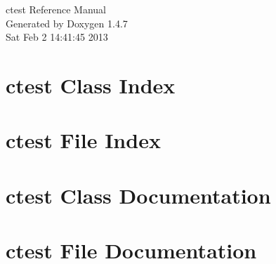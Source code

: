 \documentclass[a4paper]{book}
\begin{document}
\begin{titlepage}
\vspace*{7cm}
\begin{center}
{\Large ctest Reference Manual}\\
\vspace*{1cm}
{\large Generated by Doxygen 1.4.7}\\
\vspace*{0.5cm}
{\small Sat Feb 2 14:41:45 2013}\\
\end{center}
\end{titlepage}
\clearemptydoublepage
{}
\tableofcontents
\clearemptydoublepage
{}
\chapter{ctest Class Index}

\chapter{ctest File Index}

\chapter{ctest Class Documentation}

\chapter{ctest File Documentation}





\printindex
\end{document}
